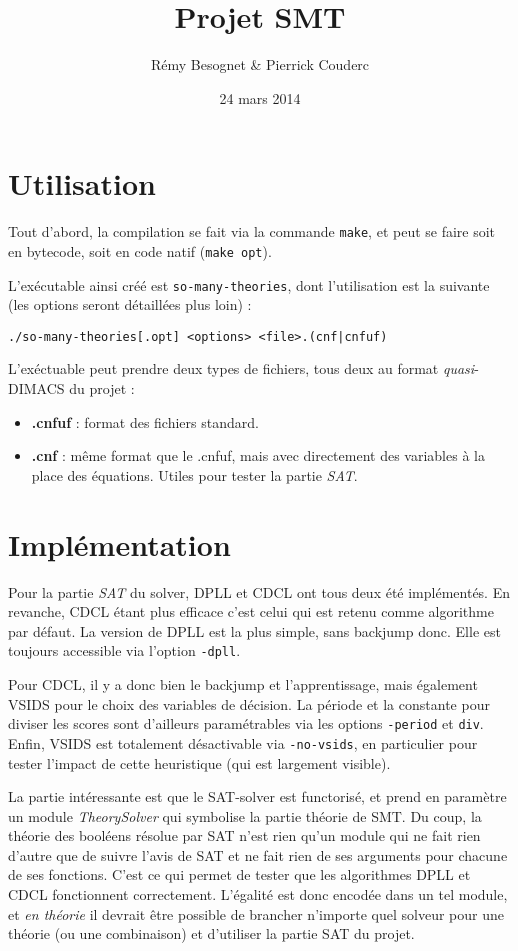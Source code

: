 \documentclass{article}
\author{Rémy Besognet \& Pierrick Couderc}
\date{24 mars 2014}
\title{Projet SMT}
\begin{document}
\maketitle

\section{Utilisation}

Tout d'abord, la compilation se fait via la commande \texttt{make}, et peut se
faire soit en bytecode, soit en code natif (\texttt{make opt}).

L'exécutable ainsi créé est \texttt{so-many-theories}, dont l'utilisation est la
suivante (les options seront détaillées plus loin) :
\begin{center}
  \texttt{./so-many-theories[.opt] <options> <file>.(cnf|cnfuf)}
\end{center}

L'exéctuable peut prendre deux types de fichiers, tous deux au format
\emph{quasi}-DIMACS du projet :
\begin{itemize}
\item \textbf{.cnfuf} : format des fichiers standard.
\item \textbf{.cnf} : même format que le .cnfuf, mais avec directement des
  variables à la place des équations. Utiles pour tester la partie \emph{SAT}.
\end{itemize}

\section{Implémentation}


Pour la partie \emph{SAT} du solver, DPLL et CDCL ont tous deux été
implémentés. En revanche, CDCL étant plus efficace c'est celui qui est retenu
comme algorithme par défaut. La version de DPLL est la plus simple, sans
backjump donc. Elle est toujours accessible via l'option \texttt{-dpll}.

Pour CDCL, il y a donc bien le backjump et l'apprentissage, mais également VSIDS
pour le choix des variables de décision. La période et la constante pour diviser
les scores sont d'ailleurs paramétrables via les options \texttt{-period} et
\texttt{div}. Enfin, VSIDS est totalement désactivable via \texttt{-no-vsids},
en particulier pour tester l'impact de cette heuristique (qui est largement
visible).

La partie intéressante est que le SAT-solver est functorisé, et prend en
paramètre un module \emph{TheorySolver} qui symbolise la partie théorie de
SMT. Du coup, la théorie des booléens résolue par SAT n'est rien qu'un module
qui ne fait rien d'autre que de suivre l'avis de SAT et ne fait rien de ses
arguments pour chacune de ses fonctions. C'est ce qui permet de tester que les
algorithmes DPLL et CDCL fonctionnent correctement. L'égalité est donc encodée
dans un tel module, et \emph{en théorie} il devrait être possible de brancher
n'importe quel solveur pour une théorie (ou une combinaison) et d'utiliser la
partie SAT du projet.
\end{document}
